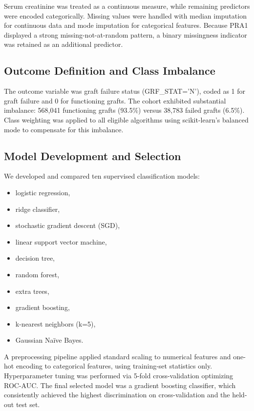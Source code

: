 \documentclass[11pt,a4paper]{article}
\begin{document}
Serum creatinine was treated as a continuous measure, while remaining predictors were encoded categorically. Missing values were handled with median imputation for continuous data and mode imputation for categorical features. Because PRA1 displayed a strong missing-not-at-random pattern, a binary missingness indicator was retained as an additional predictor.

\subsection{Outcome Definition and Class Imbalance}
The outcome variable was graft failure status (GRF\_STAT='N'), coded as 1 for graft failure and 0 for functioning grafts. The cohort exhibited substantial imbalance: 568,041 functioning grafts (93.5\%) versus 38,783 failed grafts (6.5\%). Class weighting was applied to all eligible algorithms using scikit-learn's balanced mode to compensate for this imbalance.

\subsection{Model Development and Selection}
We developed and compared ten supervised classification models:
\begin{itemize}
    \item logistic regression,
    \item ridge classifier,
    \item stochastic gradient descent (SGD),
    \item linear support vector machine,
    \item decision tree,
    \item random forest,
    \item extra trees,
    \item gradient boosting,
    \item k-nearest neighbors (k=5),
    \item Gaussian Naïve Bayes.
\end{itemize}

A preprocessing pipeline applied standard scaling to numerical features and one-hot encoding to categorical features, using training-set statistics only. Hyperparameter tuning was performed via 5-fold cross-validation optimizing ROC-AUC. The final selected model was a gradient boosting classifier, which consistently achieved the highest discrimination on cross-validation and the held-out test set.
\end{document}
